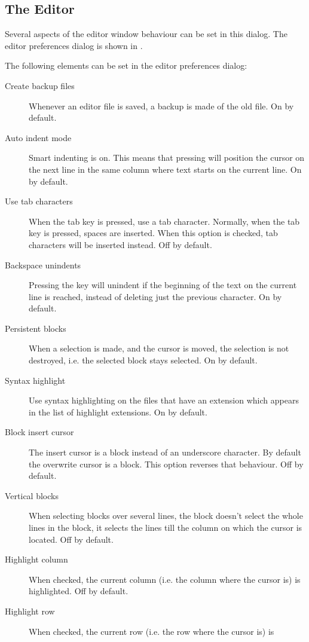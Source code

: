 \subsection{The Editor}
Several aspects of the editor window behaviour can be set in this dialog.
The editor preferences dialog is shown in .


The following elements can be set in the editor preferences dialog:
\begin{description}
\item[Create backup files]
Whenever an editor file is saved, a backup is made of the old file. On by
default.
\item[Auto indent mode]
Smart indenting is on. This means that pressing  will position the
cursor on the next line in the same column where text starts on the current
line. On by default.
\item[Use tab characters]
When the tab key is pressed, use a tab character. Normally, when the tab key
is pressed, spaces are inserted. When this option is checked, tab characters
will be inserted instead. Off by default.
\item[Backspace unindents]
Pressing the  key will unindent if the beginning of the text on
the current line is reached, instead of deleting just the previous
character. On by default.
\item[Persistent blocks]
When a selection is made, and the cursor is moved, the selection is not
destroyed, i.e. the selected block stays selected. On by default.
\item[Syntax highlight]
Use syntax highlighting on the files that have an extension which appears in
the list of highlight extensions. On by default.
\item[Block insert cursor]
The insert cursor is a block instead of an underscore character. By default
the overwrite cursor is a block. This option reverses that behaviour. Off by
default.
\item[Vertical blocks]
When selecting blocks over several lines, the block doesn't select the whole
lines in the block, it selects the lines till the column on which the cursor
is located. Off by default.
\item[Highlight column]
When checked, the current column (i.e. the column where the cursor is) is
highlighted. Off by default.
\item[Highlight row]
When checked, the current row (i.e. the row where the cursor is) is

\end{description}
